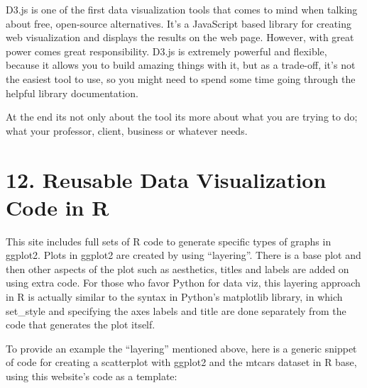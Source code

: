 \documentclass[]{book}
\theoremstyle{definition}
\theoremstyle{definition}
\theoremstyle{definition}
\theoremstyle{remark}
\begin{document}
D3.js is one of the first data visualization tools that comes to mind
when talking about free, open-source alternatives. It's a JavaScript
based library for creating web visualization and displays the results on
the web page. However, with great power comes great responsibility.
D3.js is extremely powerful and flexible, because it allows you to build
amazing things with it, but as a trade-off, it's not the easiest tool to
use, so you might need to spend some time going through the helpful
library documentation.

At the end its not only about the tool its more about what you are
trying to do; what your professor, client, business or whatever needs.

\section{12. Reusable Data Visualization Code in
R}\label{reusable-data-visualization-code-in-r}

\citep{viz_R}

This site includes full sets of R code to generate specific types of
graphs in ggplot2. Plots in ggplot2 are created by using ``layering''.
There is a base plot and then other aspects of the plot such as
aesthetics, titles and labels are added on using extra code. For those
who favor Python for data viz, this layering approach in R is actually
similar to the syntax in Python's matplotlib library, in which
set\_style and specifying the axes labels and title are done separately
from the code that generates the plot itself.

To provide an example the ``layering'' mentioned above, here is a
generic snippet of code for creating a scatterplot with ggplot2 and the
mtcars dataset in R base, using this website's code as a template:
\end{document}
